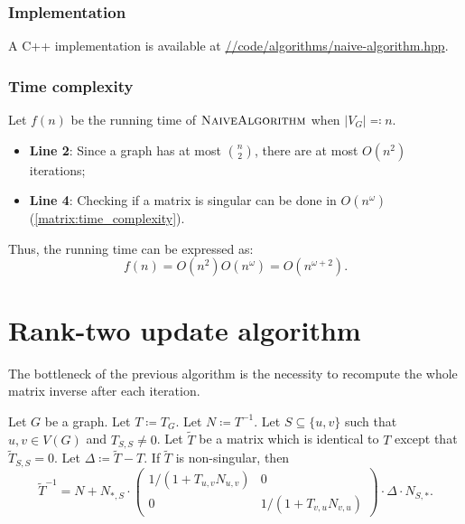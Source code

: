 \subsubsection{Implementation}
\noindent
A C++ implementation is available at
\href{https://github.com/antoniomsah/algebraic-max-matching/blob/main/code/algorithms/naive-algorithm.hpp}{//code/algorithms/naive-algorithm.hpp}.

\subsubsection{Time complexity}
\noindent
Let \(f(n)\) be the running time of \(\textsc{NaiveAlgorithm}\) when \(|V_G| \eqcolon n\).
\begin{itemize}
    \item \textbf{Line 2}: Since a graph has at most \(\binom{n}{2}\), there are at most \(O(n^2)\) iterations;
    \item \textbf{Line 4}: Checking if a matrix is singular can be done in \(O(n^\omega)\) (\cref{matrix:time_complexity}).
\end{itemize}
Thus, the running time can be expressed as:
\[
    f(n) = O(n^2) O(n^\omega) = O(n^{\omega+2}).
\]

\section{Rank-two update algorithm}

The bottleneck of the previous algorithm is the necessity to recompute the whole matrix inverse after each iteration.

\begin{theorem}
\label{thm:rank-two}
    Let \(G\) be a graph. 
    Let \(T \coloneqq T_G\). 
    Let \(N \coloneqq T^{-1}\).
    Let \(S \subseteq \{u, v\}\) such that \(u, v \in V(G)\) and \(T_{S, S} \neq 0\).
    Let \(\tilde{T}\) be a matrix which is identical to \(T\) except that \(\tilde{T}_{S, S} = 0\).
    Let \(\Delta \coloneqq \tilde{T} - T\).
    If \(\tilde{T}\) is non-singular, then
    \[
        \tilde{T}^{-1} = N + N_{*, S} \cdot 
        \begin{pmatrix}
            1 / (1 + T_{u, v}N_{u, v}) & 0 \\
            0 &  1 / (1 + T_{v, u}N_{v, u})
        \end{pmatrix}
        \cdot \Delta \cdot N_{S, *}.
    \]
\end{theorem}

